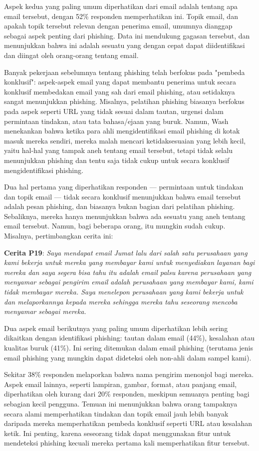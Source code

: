\documentclass[lettersize,journal]{IEEEtran}
\begin{document}
Aspek kedua yang paling umum diperhatikan dari email adalah tentang apa email tersebut, dengan 52\% responden memperhatikan ini. Topik email, dan apakah topik tersebut relevan dengan penerima email, umumnya dianggap sebagai aspek penting dari phishing. Data ini mendukung gagasan tersebut, dan menunjukkan bahwa ini adalah sesuatu yang dengan cepat dapat diidentifikasi dan diingat oleh orang-orang tentang email.

Banyak pekerjaan sebelumnya tentang phishing telah berfokus pada "pembeda konklusif": aspek-aspek email yang dapat membantu penerima untuk secara konklusif membedakan email yang sah dari email phishing, atau setidaknya sangat menunjukkan phishing. Misalnya, pelatihan phishing biasanya berfokus pada aspek seperti URL yang tidak sesuai dalam tautan, urgensi dalam permintaan tindakan, atau tata bahasa/ejaan yang buruk. Namun, Wash menekankan bahwa ketika para ahli mengidentifikasi email phishing di kotak masuk mereka sendiri, mereka malah mencari ketidaksesuaian yang lebih kecil, yaitu hal-hal yang tampak aneh tentang email tersebut, tetapi tidak selalu menunjukkan phishing dan tentu saja tidak cukup untuk secara konklusif mengidentifikasi phishing.

Dua hal pertama yang diperhatikan responden — permintaan untuk tindakan dan topik email — tidak secara konklusif menunjukkan bahwa email tersebut adalah pesan phishing, dan biasanya bukan bagian dari pelatihan phishing. Sebaliknya, mereka hanya menunjukkan bahwa ada sesuatu yang aneh tentang email tersebut. Namun, bagi beberapa orang, itu mungkin sudah cukup. Misalnya, pertimbangkan cerita ini:

\textbf{Cerita P19}: \textit{Saya mendapat email Jumat lalu dari salah satu perusahaan yang kami bekerja untuk mereka yang membayar kami untuk menyediakan layanan bagi mereka dan saya segera bisa tahu itu adalah email palsu karena perusahaan yang menyamar sebagai pengirim email adalah perusahaan yang membayar kami, kami tidak membayar mereka. Saya menelepon perusahaan yang kami bekerja untuk dan melaporkannya kepada mereka sehingga mereka tahu seseorang mencoba menyamar sebagai mereka.}

Dua aspek email berikutnya yang paling umum diperhatikan lebih sering dikaitkan dengan identifikasi phishing: tautan dalam email (44\%), kesalahan atau kualitas buruk (41\%). Ini sering ditemukan dalam email phishing (terutama jenis email phishing yang mungkin dapat dideteksi oleh non-ahli dalam sampel kami).

Sekitar 38\% responden melaporkan bahwa nama pengirim menonjol bagi mereka. Aspek email lainnya, seperti lampiran, gambar, format, atau panjang email, diperhatikan oleh kurang dari 20\% responden, meskipun semuanya penting bagi sebagian kecil pengguna. Temuan ini menunjukkan bahwa orang tampaknya secara alami memperhatikan tindakan dan topik email jauh lebih banyak daripada mereka memperhatikan pembeda konklusif seperti URL atau kesalahan ketik. Ini penting, karena seseorang tidak dapat menggunakan fitur untuk mendeteksi phishing kecuali mereka pertama kali memperhatikan fitur tersebut.
\end{document}
